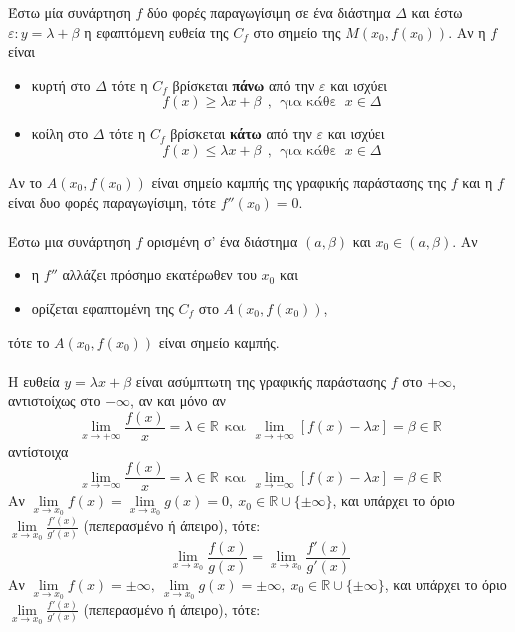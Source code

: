 Έστω μία συνάρτηση $f$ δύο φορές παραγωγίσιμη σε ένα διάστημα $\Delta$ και έστω $\varepsilon: y=\lambda +\beta$ η εφαπτόμενη ευθεία της $C_f$ στο σημείο της $M(x_0,f(x_0))$. Αν η $f$ είναι
\begin{itemize}
\item κυρτή στο $\Delta$ τότε η $C_f$ βρίσκεται \textbf{πάνω} από την $\varepsilon$ και ισχύει
\[ f(x)\geq\lambda x+\beta\ \ ,\ \ \text{για κάθε }\ x\in\Delta \]
\item κοίλη στο $\Delta$ τότε η $C_f$ βρίσκεται \textbf{κάτω} από την $\varepsilon$ και ισχύει
\[ f(x)\leq\lambda x+\beta\ \ ,\ \ \text{για κάθε }\ x\in\Delta \]
\end{itemize}
Αν το $A(x_0, f(x_0))$ είναι σημείο καμπής της γραφικής παράστασης της $f$ και η $f$ είναι δυο φορές παραγωγίσιμη, τότε $f ''(x_0) = 0$.\\\\
Έστω μια συνάρτηση $f$ ορισμένη σ' ένα διάστημα $(a,\beta)$ και $x_0\in(a,\beta)$. Αν
\begin{itemize}
\item η $f''$ αλλάζει πρόσημο εκατέρωθεν του $x_0$ και
\item ορίζεται εφαπτομένη της $C_f$ στο $A(x_0, f(x_0))$,
\end{itemize}
τότε το $A(x_0, f(x_0))$ είναι σημείο καμπής.\\\\
Η ευθεία $y=\lambda x+\beta$ είναι ασύμπτωτη της γραφικής παράστασης $f$ στο $+\infty$, αντιστοίχως στο $-\infty$, αν και μόνο αν
\[\lim\limits_{x\to+\infty}{\frac{f(x)}{x}}=\lambda\in\mathbb{R}\ \ \text{και}\ \ \lim\limits_{x\to +\infty}{[f(x)-\lambda x]}=\beta\in\mathbb{R}\]
αντίστοιχα
\[\lim\limits_{x\to-\infty}{\frac{f(x)}{x}}=\lambda\in\mathbb{R}\ \ \text{και}\ \ \lim\limits_{x\to -\infty}{[f(x)-\lambda x]}=\beta\in\mathbb{R}\]
Αν $\lim\limits_{x\to x_0}{f(x)}=\lim\limits_{x\to x_0}{g(x)}=0,\  x_0\in\mathbb{R}\cup\{\pm\infty\}$, και υπάρχει το όριο $\lim\limits_{x\to x_0}{\frac{f'(x)}{g'(x)}}$ (πεπερασμένο ή άπειρο), τότε:
\[ \lim\limits_{x\to x_0}{\frac{f(x)}{g(x)}}=\lim\limits_{x\to x_0}{\frac{f'(x)}{g'(x)}} \]
Αν $\lim\limits_{x\to x_0}{f(x)}=\pm\infty,\ \lim\limits_{x\to x_0}{g(x)}=\pm\infty,\  x_0\in\mathbb{R}\cup\{\pm\infty\}$, και υπάρχει το όριο $\lim\limits_{x\to x_0}{\frac{f'(x)}{g'(x)}}$ (πεπερασμένο ή άπειρο), τότε:
